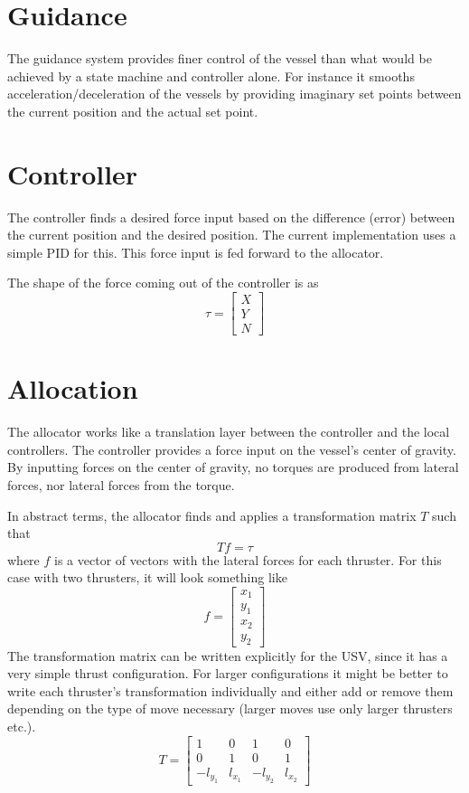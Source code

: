 \documentclass[class=article, crop=false, draft=true]{standalone}
\begin{document}
\section{Guidance}
The guidance system provides finer control of the vessel than what would be achieved by a state machine and controller alone. For instance it smooths acceleration/deceleration of the vessels by providing imaginary set points between the current position and the actual set point.

\section{Controller}
The controller finds a desired force input based on the difference (error) between the current position and the desired position. The current implementation uses a simple PID for this. This force input is fed forward to the allocator.

The shape of the force coming out of the controller is as \[\tau = \begin{bmatrix}X \\ Y \\ N\end{bmatrix}\]

\section{Allocation}
The allocator works like a translation layer between the controller and the local controllers. The controller provides a force input on the vessel's center of gravity. By inputting forces on the center of gravity, no torques are produced from lateral forces, nor lateral forces from the torque.

In abstract terms, the allocator finds and applies a transformation matrix \(T\) such that \[Tf = \tau\] where \(f\) is a vector of vectors with the lateral forces for each thruster. For this case with two thrusters, it will look something like \[f = \begin{bmatrix}x_1 \\ y_1 \\ x_2 \\ y_2 \end{bmatrix}\]
The transformation matrix can be written explicitly for the USV, since it has a very simple thrust configuration. For larger configurations it might be better to write each thruster's transformation individually and either add or remove them depending on the type of move necessary (larger moves use only larger thrusters etc.).
\begin{equation}\label{eq:transform_matrix}
T = \begin{bmatrix}1 & 0 & 1 & 0 \\ 0 & 1 & 0 & 1 \\ -l_{y_1} & l_{x_1} & -l_{y_2} & l_{x_2}\end{bmatrix}
\end{equation}
\end{document}
